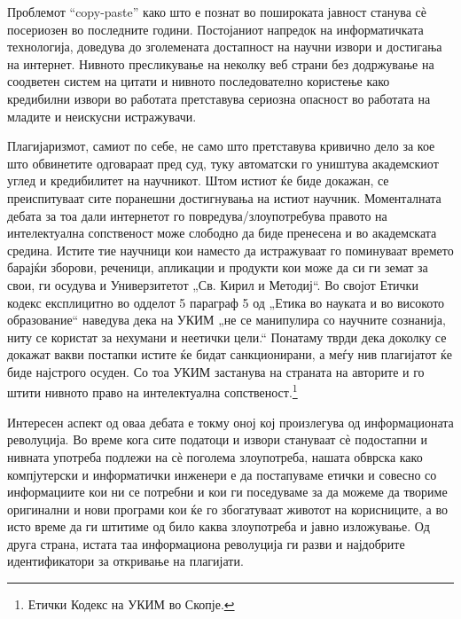 \documentclass[12pt,a4paper]{article}
\begin{document}
Проблемот ``copy-paste'' како што е познат во пошироката јавност станува сѐ
посериозен во последните години. Постојаниот напредок на информатичката
технологија, доведува до зголемената достапност на научни извори и достигања на
интернет. Нивното пресликување на неколку веб страни без додржување на
соодветен систем на цитати и нивното последователно користење како кредибилни
извори во работата претставува сериозна опасност во работата на младите и
неискусни истражувачи.
 
Плагијаризмот, самиот по себе, не само што претставува кривично дело за кое што
обвинетите одговараат пред суд, туку автоматски го уништува академскиот углед и 
кредибилитет на научникот. Штом истиот ќе биде докажан, се преиспитуваат сите
поранешни достигнувања на истиот научник. Моменталната дебата за тоа дали
интернетот го повредува/злоупотребува правото на интелектуална сопственост може
слободно да биде пренесена и во академската средина. Истите тие научници кои
наместо да истражуваат го поминуваат времето барајќи зборови, реченици,
апликации и продукти кои може да си ги земат за свои, ги осудува и Универзитетот
„Св. Кирил и Методиј“. Во својот Етички кодекс експлицитно во одделот 5 параграф
5 од „Етика во науката и во високото образование“ наведува дека на УКИМ „не се
манипулира со научните сознанија, ниту се користат за нехумани и неетички цели.“
Понатаму тврди дека доколку се докажат вакви постапки истите ќе бидат
санкционирани, а меѓу нив плагијатот ќе биде најстрого осуден. Со тоа УКИМ
застанува на страната на авторите и го штити нивното право на интелектуална
сопственост.\footnote{Етички Кодекс на УКИМ во Скопје.}

Интересен аспект од оваа дебата е токму оној кој произлегува од информационата
револуција. Во време кога сите податоци и извори стануваат сѐ подостапни и
нивната употреба подлежи на сѐ поголема злоупотреба, нашата обврска како
компјутерски и информатички инженери е да постапуваме етички и совесно со
информациите кои ни се потребни и кои ги поседуваме за да можеме да твориме
оригинални и нови програми кои ќе го збогатуваат животот на корисниците, а во
исто време да ги штитиме од било каква злоупотреба и јавно изложување. Од друга
страна, истата таа информациона револуција ги разви и најдобрите идентификатори
за откривање на плагијати.
\end{document}
